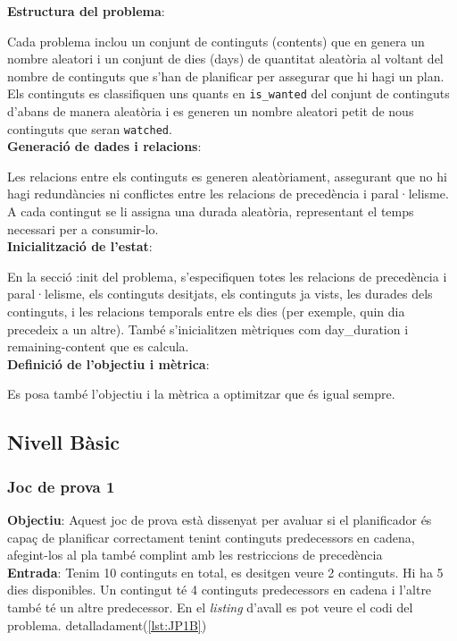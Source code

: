 \documentclass[a4paper]{article}
\begin{document}
	\noindent \textbf{Estructura del problema}:
	
	Cada problema inclou un conjunt de continguts (contents) que en genera un nombre aleatori  i un conjunt de dies (days) de quantitat aleatòria al voltant del nombre de continguts que s'han de planificar per assegurar que hi hagi un plan. Els continguts es classifiquen uns quants en \texttt{is\_wanted} del conjunt de continguts d'abans de manera aleatòria i es generen un nombre aleatori petit de nous continguts que seran \texttt{watched}. \\
	
	\noindent \textbf{Generació de dades i relacions}:
	
	Les relacions entre els continguts es generen aleatòriament, assegurant que no hi hagi redundàncies ni conflictes entre les relacions de precedència i paral·lelisme. A cada contingut se li assigna una durada aleatòria, representant el temps necessari per a consumir-lo. \\
	
	\noindent \textbf{Inicialització de l'estat}:
	
	En la secció :init del problema, s'especifiquen totes les relacions de precedència i paral·lelisme, els continguts desitjats, els continguts ja vists, les durades dels continguts, i les relacions temporals entre els dies (per exemple, quin dia precedeix a un altre). També s'inicialitzen mètriques com day\_duration i remaining-content que es calcula. \\
	
	\noindent \textbf{Definició de l'objectiu i mètrica}:
	
	Es posa també l'objectiu i la mètrica a optimitzar que és igual sempre.	
	
	\subsection{Nivell Bàsic}
	
	\subsubsection*{Joc de prova 1}
	\noindent \textbf{Objectiu}: Aquest joc de prova està dissenyat per avaluar si el planificador és capaç de planificar correctament tenint continguts predecessors en cadena, afegint-los al pla també complint amb les restriccions de precedència \\
	
	\noindent \textbf{Entrada}: Tenim 10 continguts en total, es desitgen veure 2 continguts. Hi ha 5 dies disponibles. Un contingut té 4 continguts predecessors en cadena i l'altre també té un altre predecessor. En el \textit{listing} d'avall es pot veure el codi del problema.  detalladament(\ref{lst:JP1B}) \\
	
\end{document}
